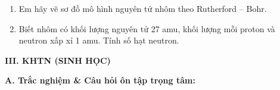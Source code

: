 \documentclass[11pt,a4paper]{article}
\begin{document}
\begin{enumerate}[label=\alph*.,leftmargin=1.5cm,itemsep=1pt]
  \item Em hãy vẽ sơ đồ mô hình nguyên tử nhôm theo Rutherford – Bohr.
  \item Biết nhôm có khối lượng nguyên tử 27 amu, khối lượng mỗi proton và neutron xấp xỉ 1 amu. Tính số hạt neutron.
\end{enumerate}
\par\vspace{1pt}\noindent\dotfill\par\vspace{3pt}\noindent\dotfill\par\vspace{3pt}\noindent\dotfill\par\vspace{3pt}\noindent\dotfill\par\vspace{3pt}\noindent\dotfill\par\vspace{3pt}\noindent
\vspace{6pt}
{\color{myGreen}\large\bfseries III. KHTN (SINH HỌC)}

\vspace{3pt}
{\color{mySub}\textbf{A. Trắc nghiệm \& Câu hỏi ôn tập trọng tâm:}}
\end{document}
